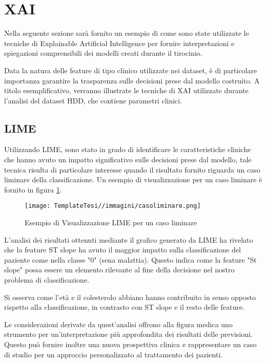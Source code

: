 \section{XAI}
\begin{flushleft}
    
Nella seguente sezione sarà fornito un esempio di come sono state utilizzate le tecniche di Explainable Artificial Intelligence per fornire interpretazioni e spiegazioni comprensibili dei modelli creati durante il tirocinio.

Data la natura delle feature di tipo clinico utilizzate nei dataset, è di particolare importanza garantire la trasparenza sulle decisioni prese dal modello costruito.
A titolo esemplificativo, verranno illustrate le tecniche di XAI utilizzate durante l'analisi del dataset HDD, che contiene parametri clinici.

\subsection{LIME}
Utilizzando LIME, sono stato in grado di identificare le caratteristiche cliniche che hanno avuto un impatto significativo sulle decisioni prese dal modello, tale tecnica risulta di particolare interesse quando il risultato fornito riguarda un caso liminare della classificazione.
Un esempio di visualizzazione per un caso liminare  è fornito in figura \ref{fig:LimeLiminare}.

\begin{figure}[H]
    \centering
    \texttt{[image: TemplateTesi//immagini/casoliminare.png]}
    \caption{Esempio di Visualizzazione LIME per un caso liminare}
    \label{fig:LimeLiminare}
\end{figure}

L'analisi dei risultati ottenuti mediante il grafico generato da LIME ha rivelato che la feature ST slope ha avuto il maggior impatto sulla classificazione del paziente come nella classe "0" (sena malattia). Questo indica come la feature "St slope" possa essere un elemento rilevante al fine della decisione nel nostro problema di classificazione.

Si osserva come l'età e il colesterolo abbiano hanno contribuito in senso opposto rispetto alla classificazione, in contrasto con ST slope e il resto delle feature.


Le considerazioni derivate da quest'analisi offrono alla figura medica uno strumento  per un'interpretazione più approfondita dei risultati delle previsioni.
Questo può fornire inoltre una nuova prospettiva clinica e rappresentare un caso di studio per un approccio personalizzato al trattamento dei pazienti.


\end{flushleft}
